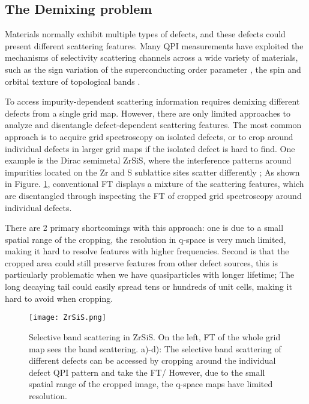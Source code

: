 \subsection{The Demixing problem}
Materials normally exhibit multiple types of defects, and these defects could present different scattering features. Many QPI measurements have exploited the mechanisms of selectivity scattering channels across a wide variety of materials, such as the sign variation of the superconducting order parameter \cite{chiSignInversionSuperconducting2014}, the spin and orbital texture of topological bands \cite{yinProbingTopologicalQuantum2021}\cite{butlerQuasiparticleInterferenceZrSiS2017}. 

To access impurity-dependent scattering information requires demixing different defects from a single grid map. However, there are only limited approaches to analyze and disentangle defect-dependent scattering features. The most common approach is to acquire grid spectroscopy on isolated defects, or to crop around individual defects in larger grid maps if the isolated defect is hard to find. One example is the Dirac semimetal ZrSiS, where the interference patterns around impurities located on the Zr and S sublattice sites scatter differently \cite{butlerQuasiparticleInterferenceZrSiS2017}; As shown in Figure. \ref{fig:ch6_ZrSiS}, conventional \ac{FT} displays a mixture of the scattering features, which are disentangled through inspecting the \ac{FT} of cropped grid spectroscopy around individual defects. 

There are 2 primary shortcomings with this approach: one is due to a small spatial range of the cropping, the resolution in q-space is very much limited, making it hard to resolve features with higher frequencies. Second is that the cropped area could still preserve features from other defect sources, this is particularly problematic when we have quasiparticles with longer lifetime; The long decaying tail could easily spread tens or hundreds of unit cells, making it hard to avoid when cropping. 

\begin{figure}
	\texttt{[image: ZrSiS.png]} 
	\centering
	\caption{Selective band scattering in ZrSiS. On the left, \ac{FT} of the whole grid map sees the band scattering. a)-d): The selective band scattering of different defects can be accessed by cropping around the individual defect QPI pattern and take the \ac{FT}/ However, due to the small spatial range of the cropped image, the q-space maps have limited resolution.}
	\label{fig:ch6_ZrSiS}
\end{figure}

